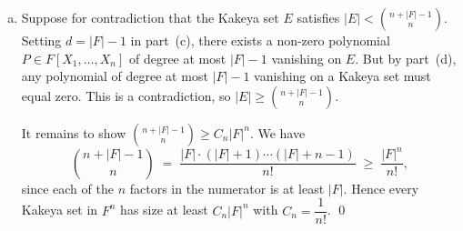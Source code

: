 \documentclass[12pt]{article}
\begin{document}
\begin{enumerate}[(a)]
  In particular every coefficient in $t$ is zero.
  The coefficient of $t^d$ in $P(x_v + tv)$ equals $P_d(v)$: indeed,
  the only contribution of degree $d$ in $t$ comes from the leading
  term $P_d(x_v + tv)$, whose $t^d$ coefficient is $P_d(v)$ by
  homogeneity.
  Hence $P_d(v) = 0$ for every $v \in F^n \setminus \{0\}$.
  Since $P_d$ is homogeneous of degree $d \geq 1$, we also have
  $P_d(0) = 0$, so $P_d$ vanishes on all of $F^n$.

  We now derive the contradiction $P_d = 0$ as a polynomial.
  Write
  \[
    P_d(X_1, \ldots, X_n)
    \;=\; \sum_{j=0}^{d} X_1^j \cdot Q_j(X_2, \ldots, X_n)
  \]
  where each $Q_j$ is a polynomial in $X_2, \ldots, X_n$.
  For any fixed $(a_2, \ldots, a_n) \in F^{n-1}$, the single-variable
  polynomial $\sum_{j=0}^{d} Q_j(a_2,\ldots,a_n)\, X_1^j$ has degree
  at most $d \leq |F|-1$ and vanishes at every element of $F$.
  By part~(a), each coefficient is zero: $Q_j(a_2,\ldots,a_n) = 0$
  for all $j$ and all $(a_2,\ldots,a_n) \in F^{n-1}$.
  Applying the same argument to each $Q_j$ in the variable $X_2$
  (with the remaining variables fixed), and continuing variable by
  variable, we conclude that every $Q_j$ is the zero polynomial.
  Hence $P_d = 0$, contradicting $P_d \neq 0$.
  Therefore $P = 0$.  \qed

  \item

  Suppose for contradiction that the Kakeya set $E$ satisfies
  $|E| < \binom{n+|F|-1}{n}$.
  Setting $d = |F|-1$ in part~(c), there exists a non-zero polynomial
  $P \in F[X_1, \ldots, X_n]$ of degree at most $|F|-1$ vanishing on
  $E$.  But by part~(d), any polynomial of degree at most $|F|-1$
  vanishing on a Kakeya set must equal zero.
  This is a contradiction, so $|E| \geq \binom{n+|F|-1}{n}$.

  It remains to show $\binom{n+|F|-1}{n} \geq C_n |F|^n$.
  We have
  \[
    \binom{n+|F|-1}{n}
    \;=\; \frac{|F|\cdot(|F|+1)\cdots(|F|+n-1)}{n!}
    \;\geq\; \frac{|F|^n}{n!},
  \]
  since each of the $n$ factors in the numerator is at least $|F|$.
  Hence every Kakeya set in $F^n$ has size at least $C_n|F|^n$ with
  $C_n = \dfrac{1}{n!}$.  \qed

\end{enumerate}
\end{document}
